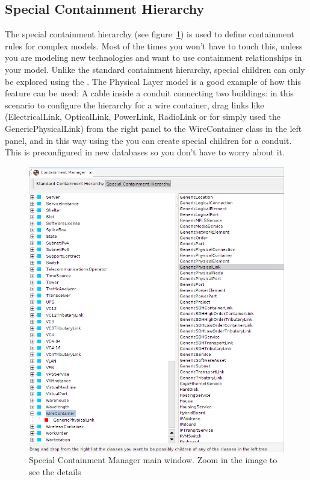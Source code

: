 \documentclass[a4paper]{article}
\begin{document}
	\subsection{Special Containment Hierarchy} \label{sec:special_containment_hierarchy}
	The special containment hierarchy (see figure~\ref{fig:special_containment_manager}) is used to define containment rules for complex models. Most of the times you won't have to touch this, unless you are modeling new technologies and want to use containment relationships in your model. Unlike the standard containment hierarchy, special children can only be explored using the \textbf{}. The Physical Layer model is a good example of how this feature can be used: A cable inside a conduit connecting two buildings: in this scenario to configure the hierarchy for a wire container, drag links like (ElectricalLink, OpticalLink, PowerLink, RadioLink or for simply used the GenericPhysicalLink) from the right panel to the WireContainer class in the left panel, and in this way using the \textbf{} you can create special children for a conduit. This is preconfigured in new databases so you don't have to worry about it.
	
	\begin{figure}[h!]
		\centering
		\includegraphics[width=0.8\linewidth]{img/special_containment_manager.png}
		\caption{Special Containment Manager main window. Zoom in the image to see the details}
		\label{fig:special_containment_manager}
	\end{figure}
	
\end{document}
